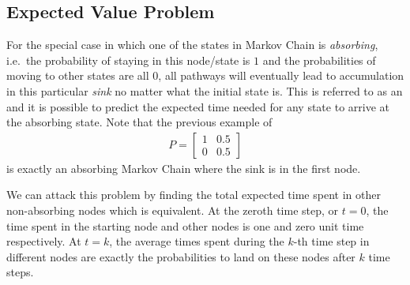 \subsection{Expected Value Problem}
For the special case in which one of the states in Markov Chain is \textit{absorbing}, i.e.\ the probability of staying in this node/state is $1$ and the probabilities of moving to other states are all $0$, all pathways will eventually lead to accumulation in this particular \textit{sink} no matter what the initial state is. This is referred to as an  and it is possible to predict the expected time needed for any state to arrive at the absorbing state. Note that the previous example of
\begin{align*}
P = 
\begin{bmatrix}
1 & 0.5 \\
0 & 0.5
\end{bmatrix}    
\end{align*}
is exactly an absorbing Markov Chain where the sink is in the first node.
\par

We can attack this problem by finding the total expected time spent in other non-absorbing nodes which is equivalent. At the zeroth time step, or $t=0$, the time spent in the starting node and other nodes is one and zero unit time respectively. At $t=k$, the average times spent during the $k$-th time step in different nodes are exactly the probabilities to land on these nodes after $k$ time steps.\par

